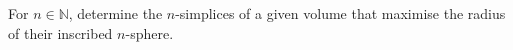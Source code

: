 For $n \in \mathbb{N}$,
determine the $n$-simplices of a given volume that maximise the radius of their inscribed $n$-sphere.
